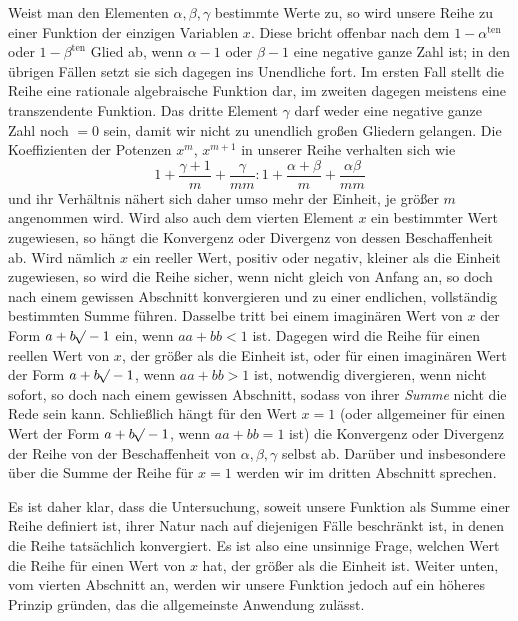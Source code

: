 Weist man den Elementen $\alpha,\beta,\gamma$ bestimmte Werte zu, so wird unsere Reihe zu einer Funktion der einzigen Variablen $x$. Diese bricht offenbar nach dem $1-\alpha^{\mathrm{ten}}$ oder $1-\beta^{\mathrm{ten}}$ Glied ab, wenn $\alpha-1$ oder $\beta-1$ eine negative ganze Zahl ist; in den übrigen Fällen setzt sie sich dagegen ins Unendliche fort. Im ersten Fall stellt die Reihe eine rationale algebraische Funktion dar, im zweiten dagegen meistens eine transzendente Funktion. Das dritte Element $\gamma$ darf weder eine negative ganze Zahl noch $=0$ sein, damit wir nicht zu unendlich großen Gliedern gelangen.
Die Koeffizienten der Potenzen $x^m$, $x^{m+1}$ in unserer Reihe verhalten sich wie
\[
1+\frac{\gamma+1}{m}+\frac{\gamma}{mm}:1+\frac{\alpha+\beta}{m}+\frac{\alpha\beta}{mm}
\]
und ihr Verhältnis nähert sich daher umso mehr der Einheit, je größer $m$ angenommen wird. Wird also auch dem vierten Element $x$ ein bestimmter Wert zugewiesen, so hängt die Konvergenz oder Divergenz von dessen Beschaffenheit ab. Wird nämlich $x$ ein reeller Wert, positiv oder negativ, kleiner als die Einheit zugewiesen, so wird die Reihe sicher, wenn nicht gleich von Anfang an, so doch nach einem gewissen Abschnitt konvergieren und zu einer endlichen, vollständig bestimmten Summe führen. Dasselbe tritt bei einem imaginären Wert von $x$ der Form $a+b\mathord{{}^{}\!\surd}-1$ ein, wenn $aa+bb<1$ ist. Dagegen wird die Reihe für einen reellen Wert von $x$, der größer als die Einheit ist, oder für einen imaginären Wert der Form $a+b\mathord{{}^{}\!\surd}-1$, wenn $aa+bb>1$ ist, notwendig divergieren, wenn nicht sofort, so doch nach einem gewissen Abschnitt, sodass von ihrer \textit{Summe} nicht die Rede sein kann. Schließlich hängt für den Wert $x=1$ (oder allgemeiner für einen Wert der Form $a+b\mathord{{}^{}\!\surd}-1$, wenn $aa+bb=1$ ist) die Konvergenz oder Divergenz der Reihe von der Beschaffenheit von $\alpha,\beta,\gamma$ selbst ab. Darüber und insbesondere über die Summe der Reihe für $x=1$ werden wir im dritten Abschnitt sprechen.

Es ist daher klar, dass die Untersuchung, soweit unsere Funktion als Summe einer Reihe definiert ist, ihrer Natur nach auf diejenigen Fälle beschränkt ist, in denen die Reihe tatsächlich konvergiert. Es ist also eine unsinnige Frage, welchen Wert die Reihe für einen Wert von $x$ hat, der größer als die Einheit ist. Weiter unten, vom vierten Abschnitt an, werden wir unsere Funktion jedoch auf ein höheres Prinzip gründen, das die allgemeinste Anwendung zulässt.

